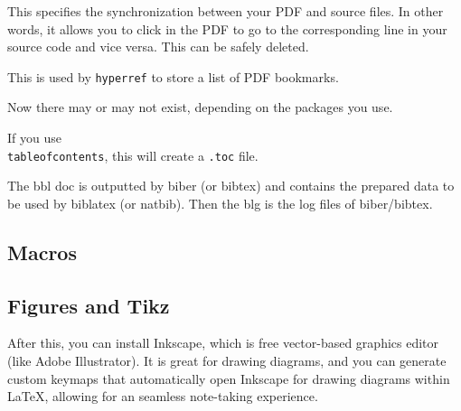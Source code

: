   \begin{definition}
    This specifies the synchronization between your PDF and source files. In other words, it allows you to click in the PDF to go to the corresponding line in your source code and vice versa. This can be safely deleted. 
  \end{definition}

  \begin{definition}
    This is used by \texttt{hyperref} to store a list of PDF bookmarks. 
  \end{definition}

  Now there may or may not exist, depending on the packages you use. 

  \begin{definition}
    If you use \texttt{\\tableofcontents}, this will create a \texttt{.toc} file. 
  \end{definition}

  \begin{definition}
    The bbl doc is outputted by biber (or bibtex) and contains the prepared data to be used by biblatex (or natbib). Then the blg is the log files of biber/bibtex. 
  \end{definition}

  \begin{definition}
    
  \end{definition}


\subsection{Macros}

\subsection{Figures and Tikz}

  After this, you can install Inkscape, which is free vector-based graphics editor (like Adobe Illustrator). It is great for drawing diagrams, and you can generate custom keymaps that automatically open Inkscape for drawing diagrams within LaTeX, allowing for an seamless note-taking experience.  


